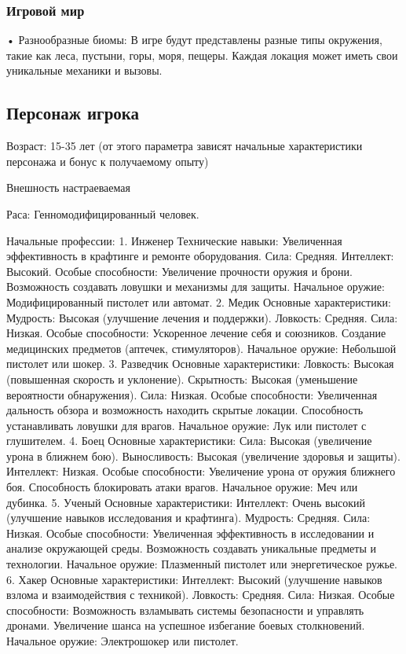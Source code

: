 \documentclass[a4paper,12pt]{article}
\begin{document}
\subsubsection{Игровой мир}
•	Разнообразные биомы: В игре будут представлены разные типы окружения, такие как леса, пустыни, горы, моря, пещеры. Каждая локация может иметь свои уникальные механики и вызовы.

\subsection{Персонаж игрока}
Возраст: 15-35 лет (от этого параметра зависят начальные характеристики персонажа и бонус к получаемому опыту)

Внешность настраеваемая 

Раса: Генномодифицированный человек.


Начальные профессии:
1. Инженер
Технические навыки: Увеличенная эффективность в крафтинге и ремонте оборудования.
Сила: Средняя.
Интеллект: Высокий.
Особые способности:
Увеличение прочности оружия и брони.
Возможность создавать ловушки и механизмы для защиты.
Начальное оружие: Модифицированный пистолет или автомат.
2. Медик
Основные характеристики:
Мудрость: Высокая (улучшение лечения и поддержки).
Ловкость: Средняя.
Сила: Низкая.
Особые способности:
Ускоренное лечение себя и союзников.
Создание медицинских предметов (аптечек, стимуляторов).
Начальное оружие: Небольшой пистолет или шокер.
3. Разведчик
Основные характеристики:
Ловкость: Высокая (повышенная скорость и уклонение).
Скрытность: Высокая (уменьшение вероятности обнаружения).
Сила: Низкая.
Особые способности:
Увеличенная дальность обзора и возможность находить скрытые локации.
Способность устанавливать ловушки для врагов.
Начальное оружие: Лук или пистолет с глушителем.
4. Боец
Основные характеристики:
Сила: Высокая (увеличение урона в ближнем бою).
Выносливость: Высокая (увеличение здоровья и защиты).
Интеллект: Низкая.
Особые способности:
Увеличение урона от оружия ближнего боя.
Способность блокировать атаки врагов.
Начальное оружие: Меч или дубинка.
5. Ученый
Основные характеристики:
Интеллект: Очень высокий (улучшение навыков исследования и крафтинга).
Мудрость: Средняя.
Сила: Низкая.
Особые способности:
Увеличенная эффективность в исследовании и анализе окружающей среды.
Возможность создавать уникальные предметы и технологии.
Начальное оружие: Плазменный пистолет или энергетическое ружье.
6. Хакер
Основные характеристики:
Интеллект: Высокий (улучшение навыков взлома и взаимодействия с техникой).
Ловкость: Средняя.
Сила: Низкая.
Особые способности:
Возможность взламывать системы безопасности и управлять дронами.
Увеличение шанса на успешное избегание боевых столкновений.
Начальное оружие: Электрошокер или пистолет.
\end{document}
